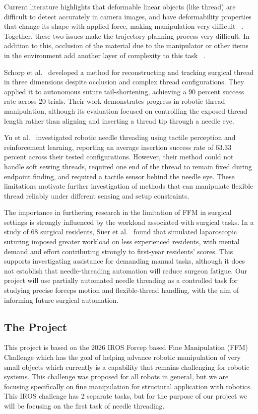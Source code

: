 \documentclass[conference]{IEEEtran}
\begin{document}
Current literature highlights that deformable linear objects (like thread) are difficult to detect accurately in camera images, and have deformability properties that change its shape with applied force, making manipulation very difficult ~\cite{schorp2023suturethread}. Together, these two issues make the trajectory planning process very difficult. In addition to this, occlusion of the material due to the manipulator or other items in the environment add another layer of complexity to this task ~\cite{schorp2023suturethread}.

Schorp et al.~\cite{schorp2023suturethread} developed a method for reconstructing and tracking surgical thread in three dimensions despite occlusion and complex thread configurations. They applied it to autonomous suture tail-shortening, achieving a 90 percent success rate across 20 trials. Their work demonstrates progress in robotic thread manipulation, although its evaluation focused on controlling the exposed thread length rather than aligning and inserting a thread tip through a needle eye.

Yu et al.~\cite{yu2023needlethreading} investigated robotic needle threading using tactile perception and reinforcement learning, reporting an average insertion success rate of 63.33 percent across their tested configurations. However, their method could not handle soft sewing threads, required one end of the thread to remain fixed during endpoint finding, and required a tactile sensor behind the needle eye. These limitations motivate further investigation of methods that can manipulate flexible thread reliably under different sensing and setup constraints.

The importance in furthering research in the limitation of FFM in surgical settings is strongly influenced by the workload associated with surgical tasks. In a study of 68 surgical residents, Süer et al.~\cite{suer2025} found that simulated laparoscopic suturing imposed greater workload on less experienced residents, with mental demand and effort contributing strongly to first-year residents’ scores. This supports investigating assistance for demanding manual tasks, although it does not establish that needle-threading automation will reduce surgeon fatigue. Our project will use partially automated needle threading as a controlled task for studying precise forceps motion and flexible-thread handling, with the aim of informing future surgical automation.

 

\subsection{The Project}
This project is based on the 2026 IROS Forcep based Fine Manipulation (FFM) Challenge which has the goal of helping advance robotic manipulation of very small objects which currently is a capability that remains challenging for robotic systems. This challenge was proposed for all robots in general, but we are focusing specifically on fine manipulation for structural application with robotics. This IROS challenge has 2 separate tasks, but for the purpose of our project we will be focusing on the first task of needle threading. 
\end{document}
